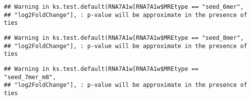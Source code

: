 \documentclass[
]{article}
\newenvironment{Shaded}{\begin{snugshade}}{\end{snugshade}}
\newcommand{\FunctionTok}[1]{\textcolor[rgb]{0.13,0.29,0.53}{\textbf{#1}}}
\newcommand{\NormalTok}[1]{#1}
\newcommand{\OtherTok}[1]{\textcolor[rgb]{0.56,0.35,0.01}{#1}}
\newcommand{\SpecialCharTok}[1]{\textcolor[rgb]{0.81,0.36,0.00}{\textbf{#1}}}
\newcommand{\StringTok}[1]{\textcolor[rgb]{0.31,0.60,0.02}{#1}}
\begin{document}
\begin{verbatim}
## Warning in ks.test.default(RNA7A1w[RNA7A1w$MREtype == "seed_6mer",
## "log2FoldChange"], : p-value will be approximate in the presence of ties
\end{verbatim}

\begin{Shaded}
\end{Shaded}

\begin{verbatim}
## Warning in ks.test.default(RNA7A1w[RNA7A1w$MREtype == "seed_8mer",
## "log2FoldChange"], : p-value will be approximate in the presence of ties
\end{verbatim}

\begin{Shaded}
\end{Shaded}

\begin{verbatim}
## Warning in ks.test.default(RNA7A1w[RNA7A1w$MREtype == "seed_7mer_m8",
## "log2FoldChange"], : p-value will be approximate in the presence of ties
\end{verbatim}

\begin{Shaded}
\end{Shaded}
\end{document}
